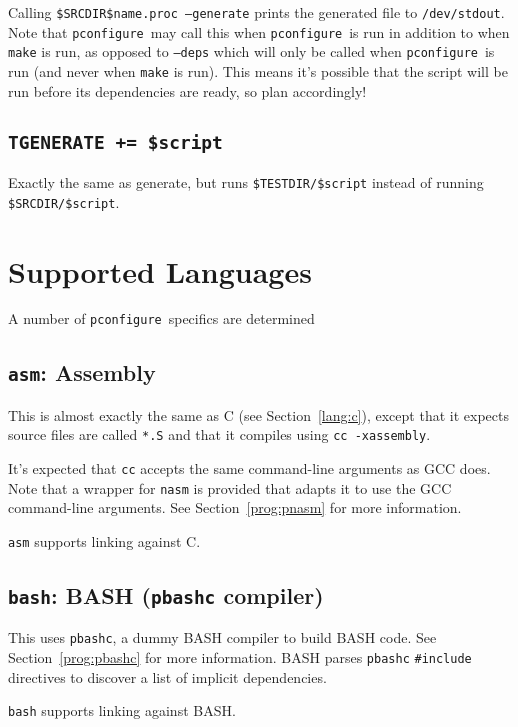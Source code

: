 \documentclass{article}
\newcommand{\pconfigure}{\texttt{pconfigure}}
\begin{document}
Calling \texttt{\$SRCDIR\$name.proc --generate} prints the generated
file to \texttt{/dev/stdout}.  Note that \pconfigure\ may call this
when \pconfigure\ is run in addition to when \texttt{make} is run, as
opposed to \texttt{--deps} which will only be called when
\pconfigure\ is run (and never when \texttt{make} is run).  This means
it's possible that the script will be run before its dependencies are
ready, so plan accordingly!

\subsection{\texttt{TGENERATE += \$script}}

Exactly the same as generate, but runs \texttt{\$TESTDIR/\$script}
instead of running \texttt{\$SRCDIR/\$script}.

\section{Supported Languages \label{lang}}

A number of \pconfigure\ specifics are determined

\subsection{\texttt{asm}: Assembly}

This is almost exactly the same as C (see Section~\ref{lang:c}),
except that it expects source files are called \texttt{*.S} and that
it compiles using \texttt{cc -xassembly}.

It's expected that \texttt{cc} accepts the same command-line arguments
as GCC does.  Note that a wrapper for \texttt{nasm} is provided that
adapts it to use the GCC command-line arguments.  See
Section~\ref{prog:pnasm} for more information.

\texttt{asm} supports linking against C.

\subsection{\texttt{bash}: BASH (\texttt{pbashc} compiler) \label{lang:bash}}

This uses \texttt{pbashc}, a dummy BASH compiler to build BASH code.
See Section~\ref{prog:pbashc} for more information.  BASH parses
\texttt{pbashc} \texttt{\#include} directives to discover a list of
implicit dependencies.

\texttt{bash} supports linking against BASH.
\end{document}
